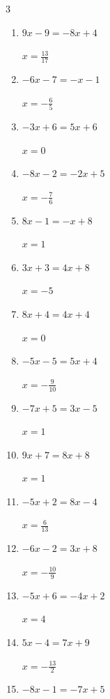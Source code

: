 \begin{multicols}{3}
\begin{enumerate}
  \item $9x-9=-8x+4$

        $\displaystyle x=\frac{13}{17}$

  \item $-6x-7=-x-1$

        $\displaystyle x=-\frac{6}{5}$

  \item $-3x+6=5x+6$

        $\displaystyle x=0$

  \item $-8x-2=-2x+5$

        $\displaystyle x=-\frac{7}{6}$

  \item $8x-1=-x+8$

        $\displaystyle x=1$

  \item $3x+3=4x+8$

        $\displaystyle x=-5$

  \item $8x+4=4x+4$

        $\displaystyle x=0$

\columnbreak %

  \item $-5x-5=5x+4$

        $\displaystyle x=-\frac{9}{10}$

  \item $-7x+5=3x-5$

        $\displaystyle x=1$

  \item $9x+7=8x+8$

        $\displaystyle x=1$

  \item $-5x+2=8x-4$

        $\displaystyle x=\frac{6}{13}$

  \item $-6x-2=3x+8$

        $\displaystyle x=-\frac{10}{9}$

  \item $-5x+6=-4x+2$

        $\displaystyle x=4$

  \item $5x-4=7x+9$

        $\displaystyle x=-\frac{13}{2}$

  \item $-8x-1=-7x+5$


\end{enumerate}
\end{multicols}
